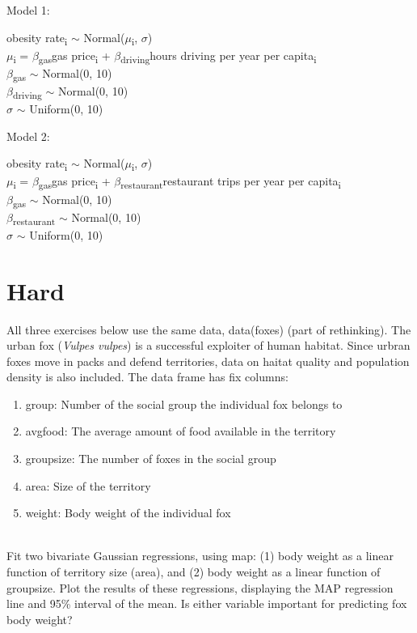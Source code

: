 \documentclass[12pt]{article}\usepackage[]{graphicx}\usepackage[]{color}
\newenvironment{problem}[2][Problem]{\begin{trivlist}
\item[\hskip \labelsep {\bfseries #1}\hskip \labelsep {\bfseries #2.}]}{\end{trivlist}}
\begin{document}
Model 1:
\begin{center}
obesity rate\textsubscript{i} $\sim$ Normal($\mu$\textsubscript{i}, $\sigma$)\\
$\mu$\textsubscript{i} = $\beta$\textsubscript{gas}gas price\textsubscript{i} + $\beta$\textsubscript{driving}hours driving per year per capita\textsubscript{i}\\
$\beta$\textsubscript{gas} $\sim$ Normal(0, 10)\\
$\beta$\textsubscript{driving} $\sim$ Normal(0, 10)\\
$\sigma$ $\sim$ Uniform(0, 10)
\end{center}

Model 2:
\begin{center}
obesity rate\textsubscript{i} $\sim$ Normal($\mu$\textsubscript{i}, $\sigma$)\\
$\mu$\textsubscript{i} = $\beta$\textsubscript{gas}gas price\textsubscript{i} + $\beta$\textsubscript{restaurant}restaurant trips per year per capita\textsubscript{i}\\
$\beta$\textsubscript{gas} $\sim$ Normal(0, 10)\\
$\beta$\textsubscript{restaurant} $\sim$ Normal(0, 10)\\
$\sigma$ $\sim$ Uniform(0, 10)
\end{center}

\section{Hard}

All three exercises below use the same data, data(foxes) (part of rethinking). The urban fox (\textit{Vulpes vulpes}) is a successful exploiter of human habitat. Since urbran foxes move in packs and defend territories, data on haitat quality and population density is also included. The data frame has fix columns:
\begin{enumerate}
	\item group: Number of the social group the individual fox belongs to
	\item avgfood: The average amount of food available in the territory
	\item groupsize: The number of foxes in the social group
	\item area: Size of the territory
	\item weight: Body weight of the individual fox
\end{enumerate}

\begin{problem}{5H1}
\text{ }\\
Fit two bivariate Gaussian regressions, using map: (1) body weight as a linear function of territory size (area), and (2) body weight as a linear function of groupsize. Plot the results of these regressions, displaying the MAP regression line and 95\% interval of the mean. Is either variable important for predicting fox body weight?
\end{problem}
\end{document}
